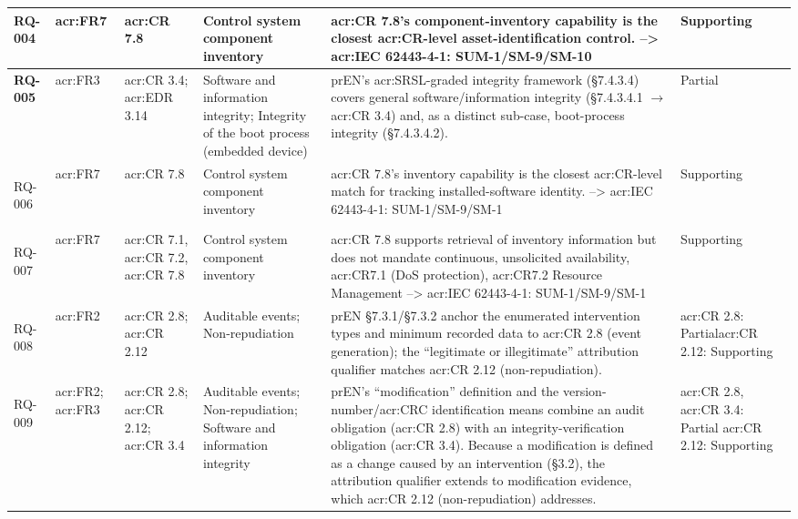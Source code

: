 \begin{longtable}{|>{\bfseries}p{1.0cm}|p{0.9cm}|p{2.4cm}|p{2.4cm}|p{4.8cm}|p{1.8cm}|}
	RQ-004 &
	\gls{acr:FR}7 &
	\gls{acr:CR} 7.8 &
	Control system component inventory &
	\gls{acr:CR} 7.8's component-inventory capability is the closest \gls{acr:CR}-level asset-identification control. --> \gls{acr:IEC} 62443-4-1: SUM-1/SM-9/SM-10 &
	Supporting \\
	\hline
	
	RQ-005 &
	\gls{acr:FR}3 &
	\gls{acr:CR} 3.4; \newline \gls{acr:EDR} 3.14 &
	Software and information integrity; Integrity of the boot process (embedded device) &
	prEN's \gls{acr:SRSL}-graded integrity framework (\S7.4.3.4) covers general software/information integrity (\S7.4.3.4.1 $\rightarrow$ \gls{acr:CR} 3.4) and, as a distinct sub-case, boot-process integrity (\S7.4.3.4.2).  &
	Partial \\
	\hline
	
	RQ-006 &
	\gls{acr:FR}7 &
	\gls{acr:CR} 7.8 &
	Control system component inventory &
	\gls{acr:CR} 7.8's inventory capability is the closest \gls{acr:CR}-level match for tracking installed-software identity. --> \gls{acr:IEC} 62443-4-1: SUM-1/SM-9/SM-1&
	Supporting \\
	\hline
	
	RQ-007 &
	\gls{acr:FR}7 &
	\gls{acr:CR} 7.1, \gls{acr:CR} 7.2, \gls{acr:CR} 7.8 &
	Control system component inventory &
	\gls{acr:CR} 7.8 supports retrieval of inventory information but does not mandate continuous, unsolicited availability, \gls{acr:CR}7.1 (DoS protection), \gls{acr:CR}7.2 Resource Management --> \gls{acr:IEC} 62443-4-1: SUM-1/SM-9/SM-1 &
	Supporting \\
	\hline
	
	RQ-008 &
	\gls{acr:FR}2 &
	\gls{acr:CR} 2.8; \newline \gls{acr:CR} 2.12 &
	Auditable events; Non-repudiation &
	prEN \S7.3.1/\S7.3.2 anchor the enumerated intervention types and minimum recorded data to \gls{acr:CR} 2.8 (event generation); the ``legitimate or illegitimate'' attribution qualifier matches \gls{acr:CR} 2.12 (non-repudiation). &
	\gls{acr:CR} 2.8: Partial\newline \gls{acr:CR} 2.12: Supporting \\
	\hline
	
	RQ-009 &
	\gls{acr:FR}2; \gls{acr:FR}3 &
	\gls{acr:CR} 2.8; \newline \gls{acr:CR} 2.12; \newline \gls{acr:CR} 3.4 &
	Auditable events; Non-repudiation; Software and information integrity &
	prEN's ``modification'' definition and the version-number/\gls{acr:CRC} identification means combine an audit obligation (\gls{acr:CR} 2.8) with an integrity-verification obligation (\gls{acr:CR} 3.4). Because a modification is defined as a change caused by an intervention (\S3.2), the attribution qualifier extends to modification evidence, which \gls{acr:CR} 2.12 (non-repudiation) addresses. &
	\gls{acr:CR} 2.8, \gls{acr:CR} 3.4: Partial \newline \gls{acr:CR} 2.12: Supporting \\
	\hline
	

\end{longtable}
